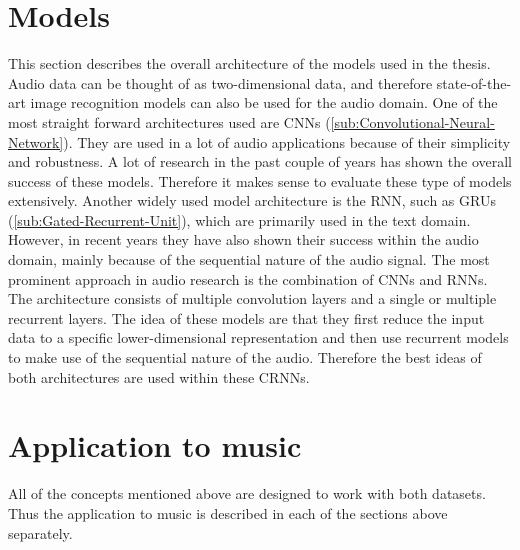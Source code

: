 \section{Models}
\label{sec:Models}
This section describes the overall architecture of the models used in the thesis. Audio data can be thought of as two-dimensional data, and therefore state-of-the-art image recognition models can also be used for the audio domain.
\newline
\newline
One of the most straight forward architectures used are \glspl{CNN} (\ref{sub:Convolutional-Neural-Network}). They are used in a lot of audio applications because of their simplicity and robustness. A lot of research in the past couple of years has shown the overall success of these models. Therefore it makes sense to evaluate these type of models extensively. 
\newline
\newline
Another widely used model architecture is the \gls{RNN}, such as \glspl{GRU} (\ref{sub:Gated-Recurrent-Unit}), which are primarily used in the text domain. However, in recent years they have also shown their success within the audio domain, mainly because of the sequential nature of the audio signal.
\newline
\newline
The most prominent approach in audio research is the combination of \glspl{CNN} and \glspl{RNN}. The architecture consists of multiple convolution layers and a single or multiple recurrent layers. The idea of these models are that they first reduce the input data to a specific lower-dimensional representation and then use recurrent models to make use of the sequential nature of the audio. Therefore the best ideas of both architectures are used within these \glspl{CRNN}.

\section{Application to music}
\label{sec:Application-Music}
All of the concepts mentioned above are designed to work with both datasets. Thus the application to music is described in each of the sections above separately.

